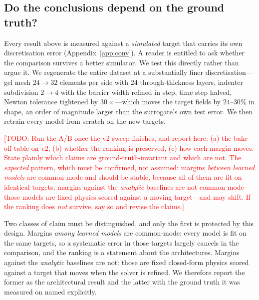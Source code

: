 \documentclass[conference]{IEEEtran}
\newcommand{\todo}[1]{\textcolor{red}{[TODO: #1]}}
\begin{document}
\subsection{Do the conclusions depend on the ground truth?}\label{sec:exp-gtinvariance}
Every result above is measured against a \emph{simulated} target that carries its
own discretisation error (Appendix~\ref{app:conv}). A reader is entitled to ask
whether the comparison survives a better simulator. We test this directly rather
than argue it. We regenerate the entire dataset at a substantially finer
discretisation---gel mesh $24\!\to\!32$ elements per side with $24$ through-thickness
layers, indenter subdivision $2\!\to\!4$ with the barrier width refined in step,
time step halved, Newton tolerance tightened by $30\times$---which moves the target
fields by $24$--$30\%$ in shape, an order of magnitude larger than the surrogate's
own test error. We then retrain every model from scratch on the new targets.

\todo{Run the A/B once the v2 sweep finishes, and report here: (a) the bake-off
table on v2, (b) whether the ranking is preserved, (c) how each margin moves. State
plainly which claims are ground-truth-invariant and which are not. The
\emph{expected} pattern, which must be confirmed, not assumed: margins \emph{between
learned models} are common-mode and should be stable, because all of them are fit on
identical targets; margins against the \emph{analytic} baselines are not
common-mode---those models are fixed physics scored against a moving target---and
may shift. If the ranking does \emph{not} survive, say so and revise the claims.}

Two classes of claim must be distinguished, and only the first is protected by this
design. Margins \emph{among learned models} are common-mode: every model is fit on
the same targets, so a systematic error in those targets largely cancels in the
comparison, and the ranking is a statement about the architectures. Margins against
the \emph{analytic} baselines are not: those are fixed closed-form physics scored
against a target that moves when the solver is refined. We therefore report the
former as the architectural result and the latter with the ground truth it was
measured on named explicitly.
\end{document}
